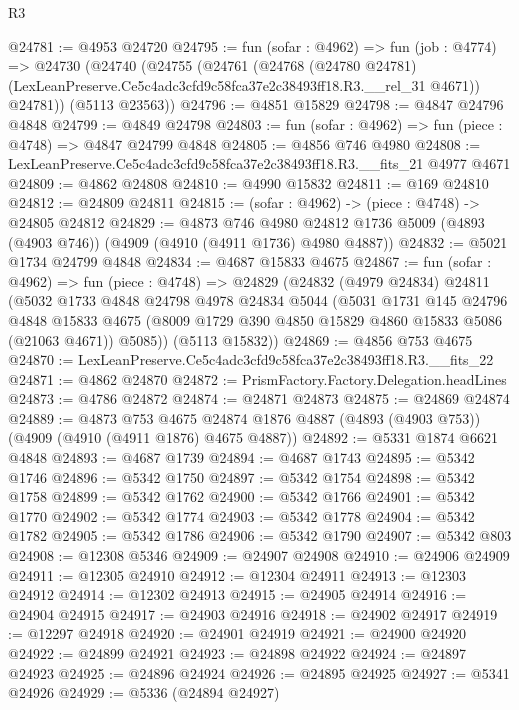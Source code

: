 \begin{lexlean}{R3}
\begin{coremodule}
@24781 := @4953 @24720
@24795 := fun (sofar : @4962) =>
  fun (job : @4774) =>
  @24730
    (@24740
      (@24755
        (@24761
          (@24768
            (@24780 @24781)
            (LexLeanPreserve.Ce5c4adc3cfd9c58fca37e2c38493ff18.R3.__rel_31 @4671))
          @24781))
      (@5113 @23563))
@24796 := @4851 @15829
@24798 := @4847 @24796 @4848
@24799 := @4849 @24798
@24803 := fun (sofar : @4962) => fun (piece : @4748) => @4847 @24799 @4848
@24805 := @4856 @746 @4980
@24808 := LexLeanPreserve.Ce5c4adc3cfd9c58fca37e2c38493ff18.R3.__fits_21 @4977 @4671
@24809 := @4862 @24808
@24810 := @4990 @15832
@24811 := @169 @24810
@24812 := @24809 @24811
@24815 := (sofar : @4962) -> (piece : @4748) -> @24805 @24812
@24829 := @4873
    @746
    @4980
    @24812
    @1736
    @5009
    (@4893 (@4903 @746))
    (@4909 (@4910 (@4911 @1736) @4980 @4887))
@24832 := @5021 @1734 @24799 @4848
@24834 := @4687 @15833 @4675
@24867 := fun (sofar : @4962) =>
  fun (piece : @4748) =>
  @24829
    (@24832
      (@4979 @24834)
      @24811
      (@5032
        @1733
        @4848
        @24798
        @4978
        @24834
        @5044
        (@5031
          @1731
          @145
          @24796
          @4848
          @15833
          @4675
          (@8009 @1729 @390 @4850 @15829 @4860 @15833 @5086 (@21063 @4671))
          @5085))
      (@5113 @15832))
@24869 := @4856 @753 @4675
@24870 := LexLeanPreserve.Ce5c4adc3cfd9c58fca37e2c38493ff18.R3.__fits_22
@24871 := @4862 @24870
@24872 := PrismFactory.Factory.Delegation.headLines
@24873 := @4786 @24872
@24874 := @24871 @24873
@24875 := @24869 @24874
@24889 := @4873
    @753
    @4675
    @24874
    @1876
    @4887
    (@4893 (@4903 @753))
    (@4909 (@4910 (@4911 @1876) @4675 @4887))
@24892 := @5331 @1874 @6621 @4848
@24893 := @4687 @1739
@24894 := @4687 @1743
@24895 := @5342 @1746
@24896 := @5342 @1750
@24897 := @5342 @1754
@24898 := @5342 @1758
@24899 := @5342 @1762
@24900 := @5342 @1766
@24901 := @5342 @1770
@24902 := @5342 @1774
@24903 := @5342 @1778
@24904 := @5342 @1782
@24905 := @5342 @1786
@24906 := @5342 @1790
@24907 := @5342 @803
@24908 := @12308 @5346
@24909 := @24907 @24908
@24910 := @24906 @24909
@24911 := @12305 @24910
@24912 := @12304 @24911
@24913 := @12303 @24912
@24914 := @12302 @24913
@24915 := @24905 @24914
@24916 := @24904 @24915
@24917 := @24903 @24916
@24918 := @24902 @24917
@24919 := @12297 @24918
@24920 := @24901 @24919
@24921 := @24900 @24920
@24922 := @24899 @24921
@24923 := @24898 @24922
@24924 := @24897 @24923
@24925 := @24896 @24924
@24926 := @24895 @24925
@24927 := @5341 @24926
@24929 := @5336 (@24894 @24927)

\end{coremodule}
\end{lexlean}

